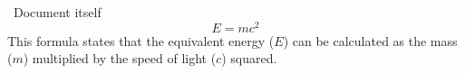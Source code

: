 \documentclass[a5paper,12pt]{article}
\begin{document}
\
Document itself
\[
E = mc^2
\]
This formula states that the equivalent energy ($E$)
can be calculated as the mass ($m$) multiplied
by the speed of light ($c$) squared.

\end{document}
